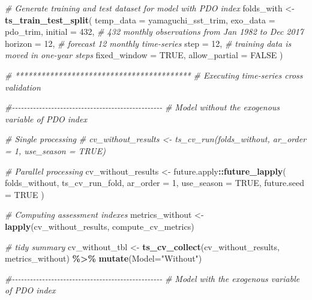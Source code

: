 \documentclass[
]{article}
\newenvironment{Shaded}{\begin{snugshade}}{\end{snugshade}}
\newcommand{\AttributeTok}[1]{\textcolor[rgb]{0.13,0.29,0.53}{#1}}
\newcommand{\CommentTok}[1]{\textcolor[rgb]{0.56,0.35,0.01}{\textit{#1}}}
\newcommand{\ConstantTok}[1]{\textcolor[rgb]{0.56,0.35,0.01}{#1}}
\newcommand{\DecValTok}[1]{\textcolor[rgb]{0.00,0.00,0.81}{#1}}
\newcommand{\FunctionTok}[1]{\textcolor[rgb]{0.13,0.29,0.53}{\textbf{#1}}}
\newcommand{\NormalTok}[1]{#1}
\newcommand{\OtherTok}[1]{\textcolor[rgb]{0.56,0.35,0.01}{#1}}
\newcommand{\SpecialCharTok}[1]{\textcolor[rgb]{0.81,0.36,0.00}{\textbf{#1}}}
\newcommand{\StringTok}[1]{\textcolor[rgb]{0.31,0.60,0.02}{#1}}
\begin{document}
\begin{Shaded}
\begin{Highlighting}[]
\CommentTok{\# Generate training and test dataset for model with PDO index}
\NormalTok{folds\_with }\OtherTok{\textless{}{-}} \FunctionTok{ts\_train\_test\_split}\NormalTok{(}
  \AttributeTok{temp\_data =}\NormalTok{ yamaguchi\_sst\_trim,}
  \AttributeTok{exo\_data =}\NormalTok{ pdo\_trim,}
  \AttributeTok{initial =} \DecValTok{432}\NormalTok{, }\CommentTok{\# 432 monthly observations from Jan 1982 to Dec 2017}
  \AttributeTok{horizon =} \DecValTok{12}\NormalTok{, }\CommentTok{\# forecast 12 monthly time{-}series}
  \AttributeTok{step =} \DecValTok{12}\NormalTok{, }\CommentTok{\# training data is moved in one{-}year steps}
  \AttributeTok{fixed\_window =} \ConstantTok{TRUE}\NormalTok{,}
  \AttributeTok{allow\_partial =} \ConstantTok{FALSE}
\NormalTok{  )}


\CommentTok{\# *****************************************}
\CommentTok{\# Executing time{-}series cross validation}

\CommentTok{\#{-}{-}{-}{-}{-}{-}{-}{-}{-}{-}{-}{-}{-}{-}{-}{-}{-}{-}{-}{-}{-}{-}{-}{-}{-}{-}{-}{-}{-}{-}{-}{-}{-}{-}{-}{-}{-}{-}{-}{-}{-}{-}{-}{-}{-}{-}{-}{-}{-}{-} }
\CommentTok{\# Model without the exogenous variable of PDO index}

\CommentTok{\# Single processing}
\CommentTok{\# cv\_without\_results \textless{}{-} ts\_cv\_run(folds\_without, ar\_order = 1, use\_season = TRUE)}

\CommentTok{\# Parallel processing}
\NormalTok{cv\_without\_results }\OtherTok{\textless{}{-}}\NormalTok{ future.apply}\SpecialCharTok{::}\FunctionTok{future\_lapply}\NormalTok{(}
\NormalTok{  folds\_without,}
\NormalTok{  ts\_cv\_run\_fold,}
  \AttributeTok{ar\_order =} \DecValTok{1}\NormalTok{,}
  \AttributeTok{use\_season =} \ConstantTok{TRUE}\NormalTok{,}
  \AttributeTok{future.seed =} \ConstantTok{TRUE}
\NormalTok{)}

\CommentTok{\# Computing assessment indexes}
\NormalTok{metrics\_without }\OtherTok{\textless{}{-}} \FunctionTok{lapply}\NormalTok{(cv\_without\_results, compute\_cv\_metrics)}

\CommentTok{\# tidy summary}
\NormalTok{cv\_without\_tbl }\OtherTok{\textless{}{-}} \FunctionTok{ts\_cv\_collect}\NormalTok{(cv\_without\_results, metrics\_without) }\SpecialCharTok{\%\textgreater{}\%}
  \FunctionTok{mutate}\NormalTok{(}\AttributeTok{Model=}\StringTok{"Without"}\NormalTok{)}


\CommentTok{\#{-}{-}{-}{-}{-}{-}{-}{-}{-}{-}{-}{-}{-}{-}{-}{-}{-}{-}{-}{-}{-}{-}{-}{-}{-}{-}{-}{-}{-}{-}{-}{-}{-}{-}{-}{-}{-}{-}{-}{-}{-}{-}{-}{-}{-}{-}{-}{-}{-}{-} }
\CommentTok{\# Model with the exogenous variable of PDO index}


\end{Highlighting}
\end{Shaded}
\end{document}
